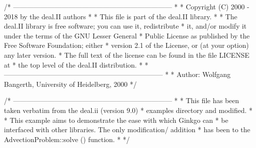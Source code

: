 \begin{DoxyCodeInclude}
\textcolor{comment}{/* ---------------------------------------------------------------------}
\textcolor{comment}{ *}
\textcolor{comment}{ * Copyright (C) 2000 - 2018 by the deal.II authors}
\textcolor{comment}{ *}
\textcolor{comment}{ * This file is part of the deal.II library.}
\textcolor{comment}{ *}
\textcolor{comment}{ * The deal.II library is free software; you can use it, redistribute}
\textcolor{comment}{ * it, and/or modify it under the terms of the GNU Lesser General}
\textcolor{comment}{ * Public License as published by the Free Software Foundation; either}
\textcolor{comment}{ * version 2.1 of the License, or (at your option) any later version.}
\textcolor{comment}{ * The full text of the license can be found in the file LICENSE at}
\textcolor{comment}{ * the top level of the deal.II distribution.}
\textcolor{comment}{ *}
\textcolor{comment}{ * ---------------------------------------------------------------------}
\textcolor{comment}{}
\textcolor{comment}{ *}
\textcolor{comment}{ * Author: Wolfgang Bangerth, University of Heidelberg, 2000}
\textcolor{comment}{ */}

\textcolor{comment}{/* ---------------------------------------------------------------------}
\textcolor{comment}{ *}
\textcolor{comment}{ * This file has been taken verbatim from the deal.ii (version 9.0)}
\textcolor{comment}{ * examples directory and modified.}
\textcolor{comment}{ *}
\textcolor{comment}{ * This example aims to demonstrate the ease with which Ginkgo can}
\textcolor{comment}{ * be interfaced with other libraries. The only modification/ addition}
\textcolor{comment}{ * has been to the AdvectionProblem::solve () function.}
\textcolor{comment}{ *}
\textcolor{comment}{ */}


\end{DoxyCodeInclude}
